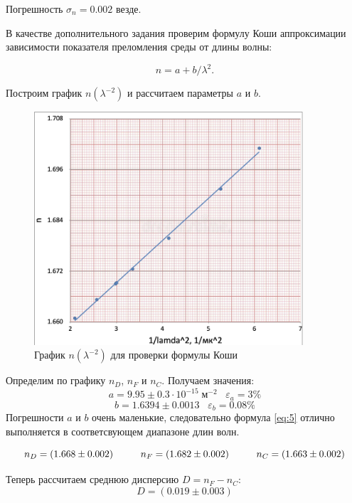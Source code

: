 \documentclass[12pt,a4paper]{article}
\begin{document}
	Погрешность $\sigma_n = 0.002$ везде.

    В качестве дополнительного задания проверим формулу Коши аппроксимации зависимости показателя преломления среды от длины волны:

    \begin{equation}
        n = a + b/\lambda^2.
        \label{eq:5}
    \end{equation}

    Построим график $n(\lambda^{-2})$ и рассчитаем параметры $a$ и $b$.

    \begin{figure}[H]
    	\centering
    	\includegraphics[width=10cm]{src/n_lambda^-2.png}
    	\caption{График $n(\lambda^{-2})$ для проверки формулы Коши}
    	\label{fig:koshi}
    \end{figure}

	Определим по графику $n_D$, $n_F$ и $n_C$. Получаем значения:
    $$ a = 9.95 \pm 0.3 \cdot 10^{-15} \; \text{м}^{-2} \;\;\; \varepsilon_a = 3\% $$
    $$ b = 1.6394 \pm 0.0013 \;\;\; \varepsilon_b = 0.08\% $$
    Погрешности $a$ и $b$ очень маленькие, следовательно формула \ref{eq:5} отлично выполняется в соответсвующем диапазоне длин волн.
	
	\begin{equation*}
		n_D = (1.668 \pm 0.002) \hspace{10mm} n_F = (1.682 \pm 0.002) \hspace{10mm} n_C = (1.663 \pm 0.002) 
	\end{equation*}

	Теперь рассчитаем среднюю дисперсию $D = n_F - n_C$:
	\begin{equation*}
		\boxed{D = (0.019 \pm 0.003)}
	\end{equation*}
\end{document}
